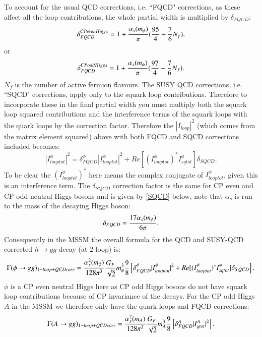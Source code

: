 \documentclass[final,3p,times,pdflatex]{elsarticle}
\begin{document}
To account for the usual QCD corrections, i.e. ``FQCD" corrections, as these affect all the loop contributions, the whole partial width is multiplied by $\delta_{FQCD}$:
\begin{equation}
\delta_{FQCD}^{CP even Higgs} = 1 + {\alpha_s(m_\phi) \over \pi}({95 \over 4}-{7 \over 6}N_{f}),
\end{equation}
or
\begin{equation}
\delta_{FQCD}^{CP odd Higgs} = 1 + {\alpha_s(m_\phi) \over \pi}({97 \over 4}-{7 \over 6}N_{f}).
\end{equation}
$N_{f}$ is the number of active fermion flavours.
The SUSY QCD corrections, i.e. ``SQCD" corrections, apply only to the squark loop contributions. Therefore to incorporate these in the final partial width you must multiply both the squark loop squared contributions and the interference terms of the squark loops with the quark loops by the correction factor. Therefore the $|I_{loop}|^2$ (which comes from the matrix element squared) above with both FQCD and SQCD corrections included becomes:
\begin{equation}
|I_{looptot}^\phi|^2 = \delta_{FQCD}^\phi|I_{looptot}^\phi|^2 + Re[({I_{looptot}^\phi})^* I_{sqtot}^\phi]\delta_{SQCD}.
\end{equation}
To be clear the $({I_{looptot}^\phi})^*$ here means the complex conjugate of ${I_{looptot}^\phi}$, given this is an interference term.
The $\delta_{SQCD}$ correction factor is the same for CP even and CP odd neutral Higgs bosons and is given by \eqref{SQCD} below, note that $\alpha_s$ is run to the mass of the decaying Higgs boson:
\begin{equation} \label{SQCD}
\delta_{SQCD} = {17 \alpha_s(m_\phi) \over 6 \pi}.
\end{equation}
Consequently in the MSSM the overall formula for the QCD and SUSY-QCD corrected $h \rightarrow gg$ decay (at 2-loop) is:
\begin{equation} \label{phiggQCDcorr}
\Gamma(\phi \rightarrow gg)_{1-loop + QCDcorr} = {\alpha_{s}^2 (m_\phi) \over 128 \pi^3}{G_{F} \over \sqrt{2}} m_{\phi}^3{9 \over 8}\left[\delta_{FQCD}^\phi|I_{looptot}^\phi|^2 + Re[({I_{looptot}^\phi})^* I_{sqtot}^\phi]\delta_{SQCD}\right].
\end{equation}
$\phi$ is a CP even neutral Higgs here as CP odd Higgs bosons do not have squark loop contributions because of CP invariance of the decays.
For the CP odd Higgs $A$ in the MSSM we therefore only have the quark loops and FQCD corrections:
\begin{equation} \label{AggQCDcorr}
\Gamma(A \rightarrow gg)_{1-loop + QCDcorr} = {\alpha_{s}^2 (m_A) \over 128 \pi^3}{G_{F} \over \sqrt{2}} m_{A}^3{9 \over 8}\left[\delta_{FQCD}^A|I_{qtot}^A|^2\right].
\end{equation}
\end{document}
